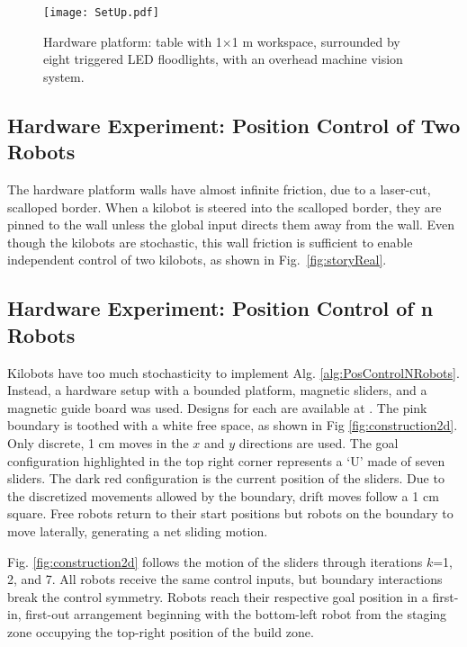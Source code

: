 \begin{figure}
\begin{center}
	\texttt{[image: SetUp.pdf]}
\end{center}
\vspace{-1em}
\caption{\label{fig:setup}
Hardware platform:  table with 1$\times$1 m workspace, surrounded by eight  triggered LED floodlights, with an overhead machine vision system.
}
\vspace{-1em}
\end{figure}
\subsection{Hardware Experiment: Position Control of Two Robots}
The hardware platform walls have almost infinite friction, due to a laser-cut, scalloped border. When a kilobot is steered into the scalloped border, they are pinned to the wall unless the global input directs them away from the wall.  Even though the kilobots are stochastic, this wall friction is sufficient to enable independent control of two kilobots, as shown in Fig.~\ref{fig:storyReal}.

\subsection{Hardware Experiment: Position Control of n Robots}
Kilobots have too much stochasticity to implement Alg. \ref{alg:PosControlNRobots}. Instead, a hardware setup with a bounded platform, magnetic sliders, and a magnetic guide board was used.  Designs for each are available at \citep{Arun2016Thingiverse}. The pink boundary is toothed with a white free space, as shown in Fig \ref{fig:construction2d}. Only discrete, 1 cm moves in the $x$ and $y$ directions are used. The goal configuration highlighted in the top right corner represents a `U' made of seven sliders. The dark red configuration is the current position of the sliders. 
Due to the discretized movements allowed by the boundary, drift moves follow a 1 cm square.  Free robots return to their start positions but robots on the boundary to move laterally, generating a net sliding motion.

Fig. \ref{fig:construction2d} follows the motion of the sliders through iterations  $k$=1, 2, and 7. All robots receive the same control inputs, but boundary interactions break the control symmetry.  Robots reach their respective goal position in a first-in, first-out arrangement beginning with the bottom-left robot from the staging zone occupying the top-right position of the build zone.

